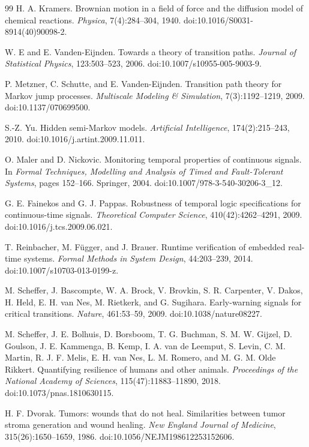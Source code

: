 \documentclass[11pt,a4paper]{article}
\newcommand{\1}{\mathbf{1}}
\begin{document}
\begin{thebibliography}{99}
H. A. Kramers.
Brownian motion in a field of force and the diffusion model of chemical reactions.
\emph{Physica}, 7(4):284--304, 1940.
doi:10.1016/S0031-8914(40)90098-2.

W. E and E. Vanden-Eijnden.
Towards a theory of transition paths.
\emph{Journal of Statistical Physics}, 123:503--523, 2006.
doi:10.1007/s10955-005-9003-9.

P. Metzner, C. Schutte, and E. Vanden-Eijnden.
Transition path theory for Markov jump processes.
\emph{Multiscale Modeling \& Simulation}, 7(3):1192--1219, 2009.
doi:10.1137/070699500.

S.-Z. Yu.
Hidden semi-Markov models.
\emph{Artificial Intelligence}, 174(2):215--243, 2010.
doi:10.1016/j.artint.2009.11.011.

O. Maler and D. Nickovic.
Monitoring temporal properties of continuous signals.
In \emph{Formal Techniques, Modelling and Analysis of Timed and Fault-Tolerant Systems}, pages 152--166. Springer, 2004.
doi:10.1007/978-3-540-30206-3\_12.

G. E. Fainekos and G. J. Pappas.
Robustness of temporal logic specifications for continuous-time signals.
\emph{Theoretical Computer Science}, 410(42):4262--4291, 2009.
doi:10.1016/j.tcs.2009.06.021.

T. Reinbacher, M. F{\"u}gger, and J. Brauer.
Runtime verification of embedded real-time systems.
\emph{Formal Methods in System Design}, 44:203--239, 2014.
doi:10.1007/s10703-013-0199-z.

M. Scheffer, J. Bascompte, W. A. Brock, V. Brovkin, S. R. Carpenter, V. Dakos, H. Held,
E. H. van Nes, M. Rietkerk, and G. Sugihara.
Early-warning signals for critical transitions.
\emph{Nature}, 461:53--59, 2009.
doi:10.1038/nature08227.

M. Scheffer, J. E. Bolhuis, D. Borsboom, T. G. Buchman, S. M. W. Gijzel, D. Goulson,
J. E. Kammenga, B. Kemp, I. A. van de Leemput, S. Levin, C. M. Martin, R. J. F. Melis,
E. H. van Nes, L. M. Romero, and M. G. M. Olde Rikkert.
Quantifying resilience of humans and other animals.
\emph{Proceedings of the National Academy of Sciences}, 115(47):11883--11890, 2018.
doi:10.1073/pnas.1810630115.

H. F. Dvorak.
Tumors: wounds that do not heal. Similarities between tumor stroma generation and wound healing.
\emph{New England Journal of Medicine}, 315(26):1650--1659, 1986.
doi:10.1056/NEJM198612253152606.


\end{thebibliography}
\end{document}
